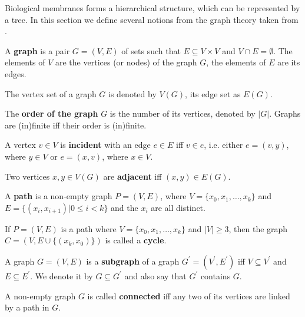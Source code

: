 Biological membranes forms a hierarchical structure, which can be represented by a tree. In this section we define several notions from the graph theory taken from \cite{Diestel97Graphs}.
\begin{definition}
  A  {\bf graph} is a pair $G = (V,E)$ of sets such that $E\subseteq V\times V$ and $V\cap E = \emptyset$. The elements of $V$ are the vertices (or nodes) of the graph $G$, the elements of $E$ are its edges.
\end{definition}

The vertex set of a graph $G$ is denoted by $V(G)$, its edge set as $E(G)$.

\begin{definition}
  The  {\bf order of the graph} $G$ is the number of its vertices, denoted by $|G|$. Graphs are (in)finite iff their order is (in)finite.
\end{definition}

\begin{definition}
  A vertex $v\in V$ is {\bf incident} with an edge $e\in E$ iff $v\in e$, i.e. either $e=(v,y)$, where $y\in V$ or $e=(x,v)$, where $x\in V$.
\end{definition}

\begin{definition}
  Two vertices $x,y\in V(G)$ are {\bf adjacent} iff $(x,y)\in E(G)$.
\end{definition}

\begin{definition}
  A {\bf path} is a non-empty graph $P=(V,E)$, where $V=\{x_0, x_1, \ldots, x_k\}$ and $E=\{(x_i,x_{i+1})|0\leq i < k\}$ and the $x_i$ are all distinct.
\end{definition}

\begin{definition}
  If $P=(V,E)$ is a path where $V=\{x_0, x_1, \ldots, x_k\}$ and $|V|\geq 3$, then the graph $C = (V,E\cup\{(x_k,x_0)\})$ is called a {\bf cycle}. 
\end{definition}

\begin{definition}
  A graph $G=(V,E)$ is a  {\bf subgraph} of a graph $G^\prime = (V^\prime, E^\prime)$ iff $V\subseteq V^\prime$ and $E\subseteq E^\prime$. We denote it by $G\subseteq G^\prime$ and also say that $G^\prime$ contains $G$.
\end{definition}

\begin{definition}
  A non-empty graph $G$ is called {\bf connected} iff any two of its vertices are linked by a path in $G$.
\end{definition}


